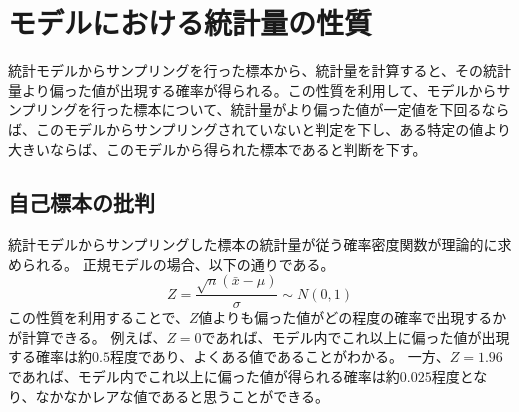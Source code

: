 \chapter{モデルにおける統計量の性質}
統計モデルからサンプリングを行った標本から、統計量を計算すると、その統計量より偏った値が出現する確率が得られる。この性質を利用して、モデルからサンプリングを行った標本について、統計量がより偏った値が一定値を下回るならば、このモデルからサンプリングされていないと判定を下し、ある特定の値より大きいならば、このモデルから得られた標本であると判断を下す。





\section{自己標本の批判}
統計モデルからサンプリングした標本の統計量が従う確率密度関数が理論的に求められる。
正規モデルの場合、以下の通りである。
\begin{equation*}
    Z = \frac{\sqrt{n}(\bar{x}-\mu)}{\sigma} \sim N(0,1)
\end{equation*}
この性質を利用することで、$Z$値よりも偏った値がどの程度の確率で出現するかが計算できる。
例えば、$Z=0$であれば、モデル内でこれ以上に偏った値が出現する確率は約$0.5$程度であり、よくある値であることがわかる。
一方、$Z=1.96$であれば、モデル内でこれ以上に偏った値が得られる確率は約$0.025$程度となり、なかなかレアな値であると思うことができる。



